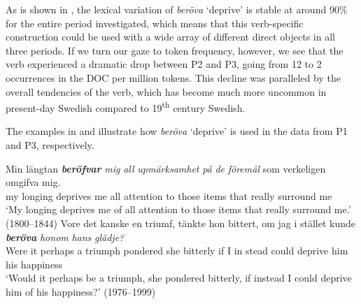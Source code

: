 \documentclass[output=paper]{langscibook}
\begin{document}
\label{sec:valdeson:5.3.3.1}



As is shown in , the lexical variation of \textit{beröva} ‘deprive’ is stable at around 90\% for the entire period investigated, which means that this verb-specific construction could be used with a wide array of different direct objects in all three periods. If we turn our gaze to token frequency, however, we see that the verb experienced a dramatic drop between P2 and P3, going from 12 to 2 occurrences in the DOC per million tokens. This decline was paralleled by the overall tendencies of the verb, which has become much more uncommon in present-day Swedish compared to 19\textsuperscript{th} century Swedish.


\begin{table}
\caption{Frequency measures of the verb{}-specific DOC with \textit{beröva} ‘deprive’}
\label{tab:valdeson:14}
\end{table}

The examples in  and  illustrate how \textit{beröva} ‘deprive’ is used in the data from P1 and P3, respectively.


\ea \label{ex:valdeson:20}
\gll Min längtan \textbf{\textit{beröfvar}} \textit{mig}   \textit{all}     \textit{upmärksamhet} \textit{på}   \textit{de}   \textit{föremål} som   verkeligen  omgifva     mig.\\
  my   longing deprives   me   all   attention       to     those   items that   really       surround   me\\
\glt ‘My longing deprives me of all attention to those items that really surround me.’ (1800–1844)
\ex \label{ex:valdeson:21}
\gll Vore  det  kanske  en  triumf,    tänkte    hon    bittert, om  jag  i   stället   kunde \textit{\textbf{beröva} }\textit{honom}    \textit{hans}  \textit{glädje?}\\
  Were   it perhaps  a  triumph  pondered  she     bitterly if    I        in   stead    could   deprive  him        his    happiness\\
\glt ‘Would it perhaps be a triumph, she pondered bitterly, if instead I could deprive him of his happiness?’ (1976–1999)
\z
\end{document}
